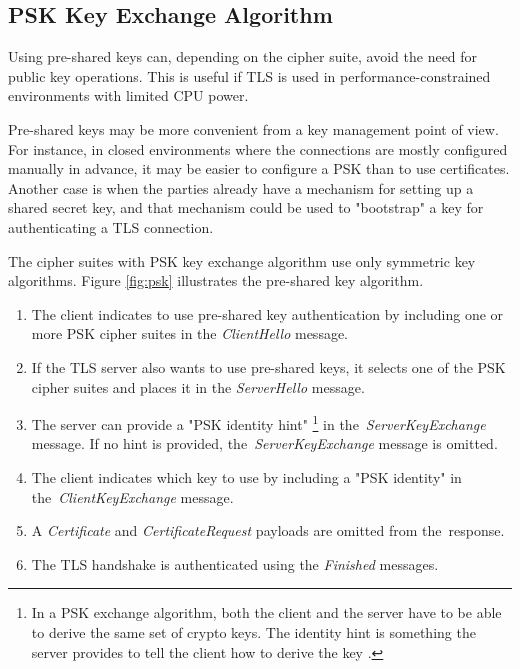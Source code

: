 \documentclass[
  oneside, 12pt, 
  printed, %
  notable,   %
  nolof,     %
  nolot,     %
]{fithesis3}
\begin{document}
\subsection{PSK Key Exchange Algorithm}\label{pskAlgorithm}
Using pre-shared keys can, depending on the cipher suite, avoid the need for public key operations.  This is useful if TLS is used in performance-constrained environments with limited CPU power.

Pre-shared keys may be more convenient from a key management point of view.  For instance, in closed environments where the connections are mostly configured manually in advance, it may be easier to configure a PSK than to use certificates. Another case is when the parties already have a mechanism for setting up a shared secret key, and that mechanism could be used to "bootstrap" a key for authenticating a TLS connection.

The cipher suites with PSK key exchange algorithm use only symmetric key algorithms. Figure \ref{fig:psk} illustrates the pre-shared key algorithm.

\begin{enumerate}
\item The client indicates to use pre-shared key authentication by including one or more PSK cipher suites in the \textit{ClientHello} message. 
\item If the TLS server also wants to use pre-shared keys, it selects one of the PSK cipher suites and places it in the \textit{ServerHello} message. 
\item The server can provide a "PSK identity hint" \footnote{In a PSK exchange algorithm, both the client and the server have to be able to derive the same set of crypto keys. The identity hint is something the server provides to tell the client how to derive the key \cite{eronen2005pre}.} in the~\textit{ServerKeyExchange} message. If no hint is provided, the~\textit{ServerKeyExchange} message is omitted.
\item The client indicates which key to use by including a "PSK identity" in the~\textit{ClientKeyExchange} message.
\item A \textit{Certificate} and \textit{CertificateRequest} payloads are omitted from the~response.
\item The TLS handshake is authenticated using the \textit{Finished} messages. 
\end{enumerate}
\end{document}
